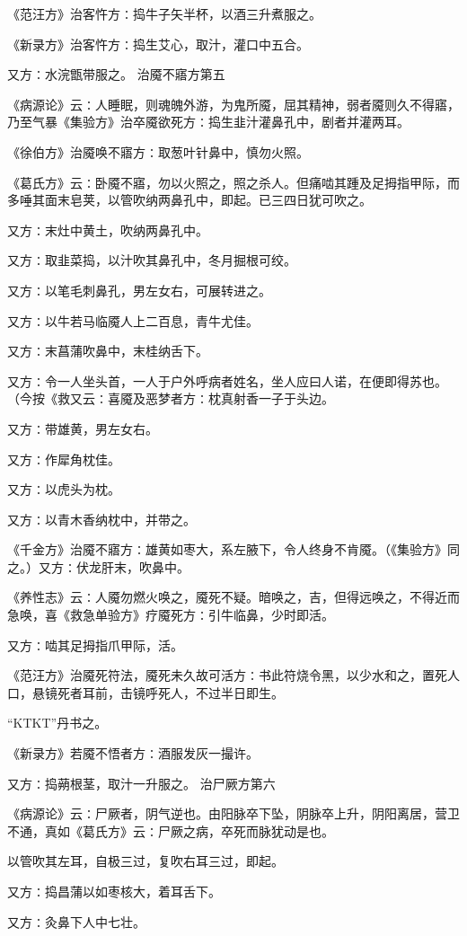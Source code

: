 \documentclass[a4paper,12pt,UTF8,twoside]{ctexbook}
\begin{document}
《范汪方》治客忤方∶捣牛子矢半杯，以酒三升煮服之。

《新录方》治客忤方∶捣生艾心，取汁，灌口中五合。

又方∶水浣甑带服之。
治魇不寤方第五

《病源论》云∶人睡眠，则魂魄外游，为鬼所魇，屈其精神，弱者魇则久不得寤，乃至气暴《集验方》治卒魇欲死方∶捣生韭汁灌鼻孔中，剧者并灌两耳。

《徐伯方》治魇唤不寤方∶取葱叶针鼻中，慎勿火照。

《葛氏方》云∶卧魇不寤，勿以火照之，照之杀人。但痛啮其踵及足拇指甲际，而多唾其面末皂荚，以管吹纳两鼻孔中，即起。已三四日犹可吹之。

又方∶末灶中黄土，吹纳两鼻孔中。

又方∶取韭菜捣，以汁吹其鼻孔中，冬月掘根可绞。

又方∶以笔毛刺鼻孔，男左女右，可展转进之。

又方∶以牛若马临魇人上二百息，青牛尤佳。

又方∶末菖蒲吹鼻中，末桂纳舌下。

又方∶令一人坐头首，一人于户外呼病者姓名，坐人应曰人诺，在便即得苏也。（今按《救又云∶喜魇及恶梦者方∶枕真射香一子于头边。

又方∶带雄黄，男左女右。

又方∶作犀角枕佳。

又方∶以虎头为枕。

又方∶以青木香纳枕中，并带之。

《千金方》治魇不寤方∶雄黄如枣大，系左腋下，令人终身不肯魇。（《集验方》同之。）又方∶伏龙肝末，吹鼻中。

《养性志》云∶人魇勿燃火唤之，魇死不疑。暗唤之，吉，但得远唤之，不得近而急唤，喜《救急单验方》疗魇死方∶引牛临鼻，少时即活。

又方∶啮其足拇指爪甲际，活。

《范汪方》治魇死符法，魇死未久故可活方∶书此符烧令黑，以少水和之，置死人口，悬镜死者耳前，击镜呼死人，不过半日即生。

“KTKT”丹书之。

《新录方》若魇不悟者方∶酒服发灰一撮许。

又方∶捣蒴根茎，取汁一升服之。
治尸厥方第六

《病源论》云∶尸厥者，阴气逆也。由阳脉卒下坠，阴脉卒上升，阴阳离居，营卫不通，真如《葛氏方》云∶尸厥之病，卒死而脉犹动是也。

以管吹其左耳，自极三过，复吹右耳三过，即起。

又方∶捣昌蒲以如枣核大，着耳舌下。

又方∶灸鼻下人中七壮。
\end{document}
